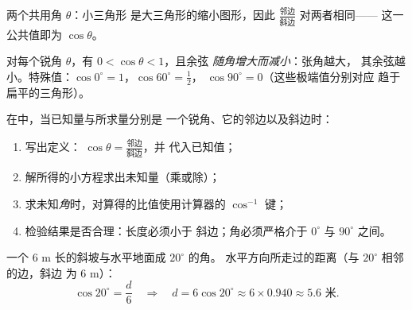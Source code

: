 \begin{omfigure}

{\small 两个共用角 $\theta$：小三角形
是大三角形的缩小图形，因此
$\frac{\text{邻边}}{\text{斜边}}$ 对两者相同——
这一公共值即为 $\cos\theta$。}
\end{omfigure}

\begin{proposition}[初值与界]\label{prop:g8:cosine:bounds}
对每个锐角 $\theta$，有 $0 < \cos\theta < 1$，且余弦
\emph{随角增大而减小}：张角越大，
其余弦越小。特殊值：$\cos 0^\circ = 1$，$\cos 60^\circ = \frac12$，
$\cos 90^\circ = 0$（这些极端值分别对应
趋于扁平的三角形）。
\end{proposition}
\admitted

\begin{method}[利用余弦]\label{met:g8:cosine:use}
在中，当已知量与所求量分别是
一个锐角、它的邻边以及斜边时：
\begin{enumerate}
  \item 写出定义：
        $\cos\theta = \frac{\text{邻边}}{\text{斜边}}$，并
        代入已知值；
  \item 解所得的小方程求出未知量（乘或除）；
  \item 求未知\emph{角}时，对算得的比值使用计算器的
        $\cos^{-1}$ 键；
  \item 检验结果是否合理：长度必须小于
        斜边；角必须严格介于 $0^\circ$ 与
        $90^\circ$ 之间。
\end{enumerate}
\end{method}

\begin{example}[求边长]\label{ex:g8:cosine:side}
一个 $6$ m 长的斜坡与水平地面成 $20^\circ$ 的角。
水平方向所走过的距离（与 $20^\circ$ 相邻的边，斜边
为 $6$ m）：
\[
\cos 20^\circ = \frac{d}{6}
\quad\Longrightarrow\quad
d = 6 \cos 20^\circ \approx 6 \times 0.940 \approx 5.6 \text{ 米}.
\]
\end{example}


